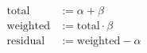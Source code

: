 \begin{align}
  \mathrm{total}    &:= \alpha + \beta \\
  \mathrm{weighted} &:= \mathrm{total} \cdot \beta \\
  \mathrm{residual} &:= \mathrm{weighted} - \alpha
\end{align}
